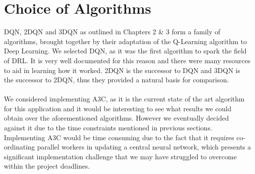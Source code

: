 \section{Choice of Algorithms} \label{sec:algos}
DQN, 2DQN and 3DQN as outlined in Chapters 2 \& 3 form a family of algorithms, brought together by their adaptation of the Q-Learning algorithm to Deep Learning. We selected DQN, as it was the first algorithm to spark the field of DRL. It is very well documented for this reason and there were many resources to aid in learning how it worked. 2DQN is the successor to DQN and 3DQN is the successor to 2DQN, thus they provided a natural basis for comparison. \paragraph{}

We considered implementing A3C, as it is the current state of the art algorithm for this application and it would be interesting to see what results we could obtain over the aforementioned algorithms. However we eventually decided against it due to the time constraints mentioned in previous sections. Implementing A3C would be time consuming due to the fact that it requires co-ordinating parallel workers in updating a central neural network, which presents a significant implementation challenge that we may have struggled to overcome within the project deadlines.

